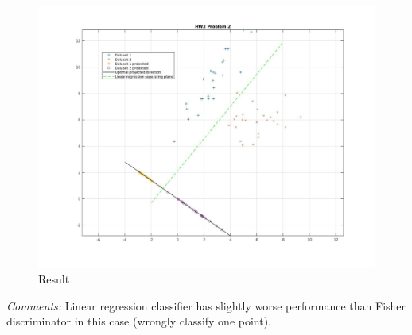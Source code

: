 \documentclass[12pt]{article}
\begin{document}
\begin{figure}[h!]
\begin{center}
  \caption{Result}
  \includegraphics[width=1\textwidth]{images/untitled.jpg}
 \end{center}
\end{figure}

\textit{Comments:}
Linear regression classifier has slightly worse performance than Fisher discriminator in this case (wrongly classify one point). 
 
\end{document}
